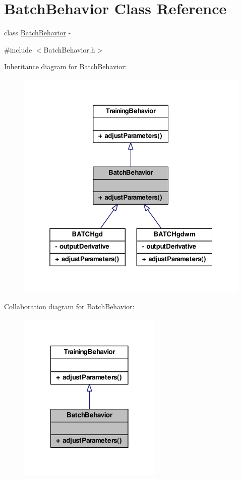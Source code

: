\hypertarget{class_batch_behavior}{
\section{BatchBehavior Class Reference}
\label{class_batch_behavior}
}


class \hyperlink{class_batch_behavior}{BatchBehavior} -\/  




{\ttfamily \#include $<$BatchBehavior.h$>$}



Inheritance diagram for BatchBehavior:
\nopagebreak
\begin{figure}[H]
\begin{center}
\leavevmode
\includegraphics[width=327pt]{class_batch_behavior__inherit__graph}
\end{center}
\end{figure}


Collaboration diagram for BatchBehavior:
\nopagebreak
\begin{figure}[H]
\begin{center}
\leavevmode
\includegraphics[width=194pt]{class_batch_behavior__coll__graph}
\end{center}
\end{figure}
